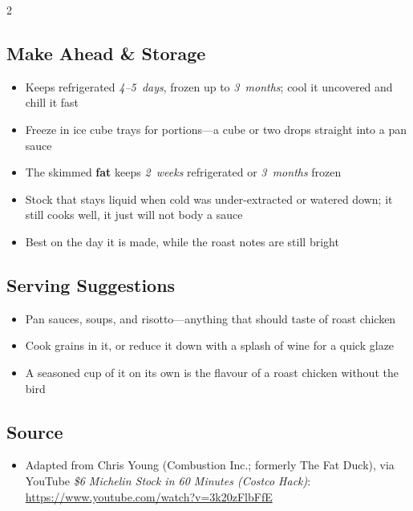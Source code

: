 \documentclass[11pt,letterpaper]{article}
\begin{document}
{\begin{multicols}{2}
\subsection*{Make Ahead \& Storage}
\begin{itemize}
    \item Keeps refrigerated \textit{4--5~days}, frozen up to \textit{3~months}; cool it uncovered and chill it fast
    \item Freeze in ice cube trays for portions---a cube or two drops straight into a pan sauce
    \item The skimmed \textbf{fat} keeps \textit{2~weeks} refrigerated or \textit{3~months} frozen
    \item Stock that stays liquid when cold was under-extracted or watered down; it still cooks well, it just will not body a sauce
    \item Best on the day it is made, while the roast notes are still bright
\end{itemize}

\subsection*{Serving Suggestions}
\begin{itemize}
    \item Pan sauces, soups, and risotto---anything that should taste of roast chicken
    \item Cook grains in it, or reduce it down with a splash of wine for a quick glaze
    \item A seasoned cup of it on its own is the flavour of a roast chicken without the bird
\end{itemize}

\subsection*{Source}
\begin{itemize}
    \item Adapted from Chris Young (Combustion Inc.; formerly The Fat Duck), via YouTube \textit{\$6 Michelin Stock in 60 Minutes (Costco Hack)}: \url{https://www.youtube.com/watch?v=3k20zFlbFfE}
\end{itemize}

\end{multicols}
}
\end{document}
